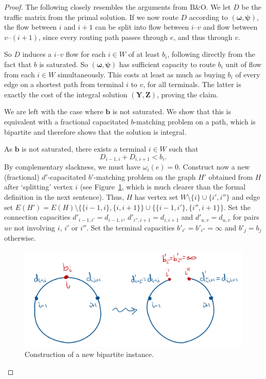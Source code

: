 \documentclass[11pt]{article}
\begin{document}
\begin{proof}
        The following closely resembles the arguments from B\&O\@.
        We let $D$ be the traffic matrix from the primal solution.
        If we now route $D$ according to $(\boldsymbol \omega, \boldsymbol \psi)$, the flow between $i$ and $i+1$ can be split into flow between $i$--$v$ and flow between $v$--$(i+1)$, since every routing path passes through $e$, and thus through $v$.

        So $D$ induces a $i$--$v$ flow for each $i \in W$ of at least $b_i$, following directly from the fact that $b$ is saturated.
        So $(\boldsymbol \omega, \boldsymbol \psi)$ has sufficient capacity to route $b_i$ unit of flow from each $i \in W$ simultaneously.
        This costs at least as much as buying $b_i$ of every edge on a shortest path from terminal $i$ to $v$, for all terminals.
        The latter is exactly the cost of the integral solution $(\boldsymbol Y, \boldsymbol Z)$, proving the claim.

        We are left with the case where $\boldsymbol b$ is not saturated.
        We show that this is equivalent with a fractional capacitated $b$-matching problem on a path, which is bipartite and therefore shows that the solution is integral.

        As $\boldsymbol b$ is not saturated, there exists a terminal $i \in W$ such that
        \[
            D_{i-1,i} + D_{i,i+1} < b_i.
        \]
        By complementary slackness, we must have $\omega_i(e) = 0$.
        Construct now a new (fractional) $d'$-capacitated $b'$-matching problem on the graph $H'$ obtained from $H$ after `splitting' vertex $i$ (see Figure~\ref{fig:split}, which is much clearer than the formal definition in the next sentence).
        Thus, $H$ has vertex set $W\setminus \{i\} \cup \{i', i''\}$ and edge set $E(H') = E(H) \setminus \{ \{i-1,i\}, \{i, i+1\} \} \cup \{ \{i-1, i'\}, \{i'', i+1\} \}$.
        Set the connection capacities $d'_{i-1,i'} = d_{i-1,i}$, $d'_{i'',i+1} = d_{i,i+1}$ and $d'_{u,v} = d_{u,v}$ for pairs $uv$ not involving $i$, $i'$ or $i''$.
        Set the terminal capacities $b'_{i'} = b'_{i''} = \infty$ and $b'_j = b_j$ otherwise.

        \begin{figure}[h]
            \centering
            \includegraphics[width=.65\textwidth]{split}
            \caption{Construction of a new bipartite instance.} \label{fig:split}
        \end{figure}


\end{proof}
\end{document}
